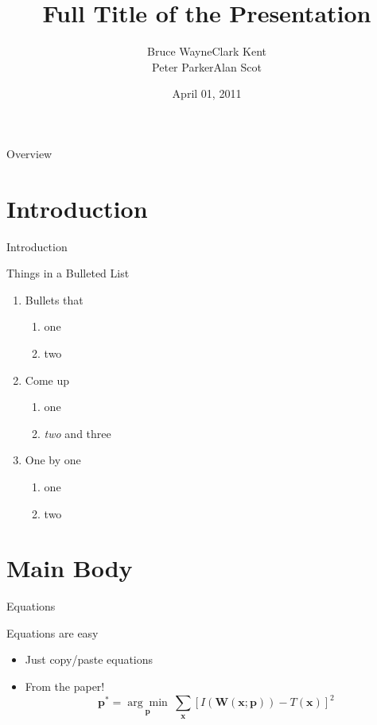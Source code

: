 \documentclass[utf8, a4paper, handout]{beamer}
\title
  [Short Title]
  {Full Title of the Presentation}
\author
  [Bruce Wayne]
  {Bruce Wayne\quad Clark Kent\\Peter Parker\quad Alan Scot}
\date
  {April 01, 2011}
\institute
  {Justice League of America}
\begin{document}
\maketitle

\begin{frame}{Overview}

  \tableofcontents

\end{frame}

\section
  {Introduction}

\begin{frame}
  {Introduction}

  Things in a Bulleted List\pause

  \begin{enumerate}
  \item Bullets that
    \begin{enumerate}
    \item one
    \item two
    \end{enumerate}\pause
  \item Come up
    \begin{enumerate}
    \item one
    \item \emph{two} and three
    \end{enumerate}\pause
  \item One by one
    \begin{enumerate}
    \item one
    \item two
    \end{enumerate}
  \end{enumerate}
\end{frame}


\section
  {Main Body}

\begin{frame}
  {Equations}

  Equations are easy
  \begin{itemize}
  \item Just copy/paste equations\pause
  \item From the paper!
    \begin{equation*}
      \textbf{p}^* = \underset{\textbf{p}}{\arg\!\min}~\sum_{\textbf{x}}\left[ I(\textbf{W}(\textbf{x};\textbf{p})) - T(\textbf{x}) \right]^2
    \end{equation*}
  \end{itemize}
\end{frame}
\end{document}
